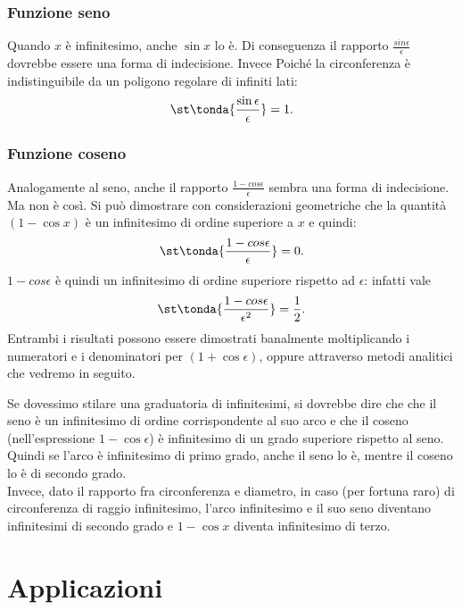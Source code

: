 \subsubsection{Funzione seno}
\label{subsubsec:insnum_fseno}
Quando $x$ è infinitesimo, anche $\sin x$ lo è. Di conseguenza il rapporto
$\frac{sin\epsilon}{\epsilon}$ dovrebbe essere una forma di indecisione. 
Invece Poiché la circonferenza è indistinguibile da un poligono regolare di 
infiniti lati:
\[
 \st\tonda{\frac{\sin \epsilon}{\epsilon}}=1.
\]

\subsubsection{Funzione coseno}
\label{subsubsec:insnum_fcoseno}
Analogamente al seno, anche il rapporto \(\frac{1-cos \epsilon}{\epsilon}\)
sembra una forma di indecisione. 
Ma non è così. Si può dimostrare con considerazioni geometriche che 
la quantità $(1-\cos x)$ è un infinitesimo di ordine superiore a 
$x$ e quindi:
\[
 \st\tonda{\frac{1-cos \epsilon}{\epsilon}}=0.
\]
$1-cos \epsilon$ è quindi un infinitesimo di ordine superiore rispetto ad 
$\epsilon$: infatti vale
\[
 \st\tonda{\frac{1-cos \epsilon}{\epsilon^2}}=\frac{1}{2}.
\]
Entrambi i risultati possono essere dimostrati banalmente moltiplicando i 
numeratori e i denominatori per $(1+\cos \epsilon)$, oppure attraverso 
metodi analitici che vedremo in seguito.

\begin{osservazione}
Se dovessimo stilare una graduatoria di infinitesimi, si dovrebbe dire che 
che il seno è un infinitesimo di ordine corrispondente al suo arco e che il 
coseno
(nell'espressione $1-\cos \epsilon$) è infinitesimo di un grado superiore 
rispetto al seno.
Quindi se l'arco è infinitesimo di primo grado, anche il seno lo è, mentre
il coseno lo è di secondo grado.\\
Invece, dato il rapporto fra circonferenza e diametro, in caso (per fortuna 
raro) di circonferenza di raggio infinitesimo, l'arco infinitesimo e il 
suo seno diventano infinitesimi di secondo grado e $1-\cos x$ diventa 
infinitesimo di terzo.
\end{osservazione}



\section{Applicazioni}
\label{sec:insnum_applicazioni}

